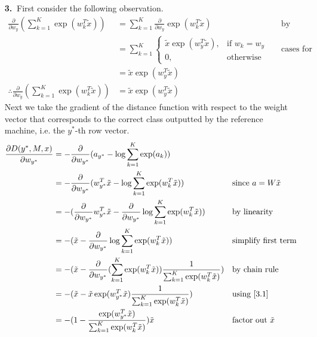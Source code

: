 \documentclass [10pt]{article}
\begin{document}
\begin{enumerate}
	\item[\textbf{3.$\>$}]First consider the following observation.
	\begin{align}
		\frac{\partial}{\partial w_{y}} (\sum_{k=1}^{K} \exp(w_{k}^{T}\tilde{x})) &= \sum_{k=1}^{K} \frac{\partial}{\partial w_{y}} \exp(w_{k}^{T}\tilde{x}) && \text{by linearity} \nonumber \\
		&= \sum_{k=1}^{K} \begin{cases}
			\tilde{x}\exp(w_{y}^{T}\tilde{x}), & \text{if $w_{k}=w_{y}$} \\
			0, & \text{otherwise}
		\end{cases} && \text{cases for the derivative} \nonumber \\
		&= \tilde{x}\exp(w_{y}^{T}\tilde{x}) \nonumber \\
		\label{3.1} \tag{3.1} \therefore \frac{\partial}{\partial w_{y}} (\sum_{k=1}^{K} \exp(w_{k}^{T}\tilde{x})) &= \tilde{x}\exp(w_{y}^{T}\tilde{x})
	\end{align}
	Next we take the gradient of the distance function with respect to the weight vector that corresponds to the correct class outputted by the reference machine, i.e. the $y^{*}$-th row vector.
	\begin{align}
		\frac{\partial D(y^{*},M,x)}{\partial w_{y^{*}}} &= -\frac{\partial}{\partial w_{y^{*}}} (a_{y^{*}} - \log \sum_{k=1}^{K} \exp(a_{k})) \nonumber \\
		&= -\frac{\partial}{\partial w_{y^{*}}} (w_{y^{*}}^{T}\tilde{x} - \log \sum_{k=1}^{K} \exp(w_{k}^{T}\tilde{x})) && \text{since $a=W\tilde{x}$} \nonumber \\
		&= -(\frac{\partial}{\partial w_{y^{*}}}w_{y^{*}}^{T}\tilde{x} - \frac{\partial}{\partial w_{y^{*}}}\log \sum_{k=1}^{K} \exp(w_{k}^{T}\tilde{x})) && \text{by linearity} \nonumber \\
		&= -(\tilde{x} - \frac{\partial}{\partial w_{y^{*}}} \log \sum_{k=1}^{K} \exp(w_{k}^{T}\tilde{x})) && \text{simplify first term} \nonumber \\
		&= -(\tilde{x} - \frac{\partial}{\partial w_{y^{*}}}(\sum_{k=1}^{K} \exp(w_{k}^{T}\tilde{x})) \frac{1}{\sum_{k=1}^{K} \exp(w_{k}^{T}\tilde{x})}) && \text{by chain rule} \nonumber \\
		&= -(\tilde{x} - \tilde{x}\exp(w_{y^{*}}^{T}\tilde{x})\frac{1}{\sum_{k=1}^{K} \exp(w_{k}^{T}\tilde{x})}) && \text{using \ref{3.1}} \nonumber \\
		&= -(1 - \frac{\exp(w_{y^{*}}^{T}\tilde{x})}{\sum_{k=1}^{K} \exp(w_{k}^{T}\tilde{x})})\tilde{x} && \text{factor out $\tilde{x}$} \nonumber \\

\end{align}
\end{enumerate}
\end{document}
